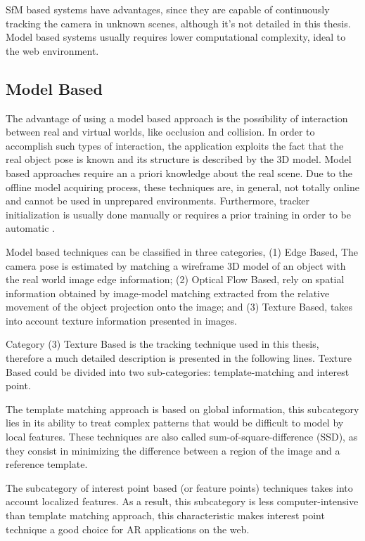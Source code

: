 SfM based systems have advantages, since they are capable of continuously tracking the camera in unknown scenes, although it's not detailed in this thesis. Model based systems usually requires lower computational complexity, ideal to the web environment.


\subsection{Model Based} %
\label{sub:basic_concepts:markerless_tracking_technique:model_based}

The advantage of using a model based approach is the possibility of interaction between real and virtual worlds, like occlusion and collision. In order to accomplish such types of interaction, the application exploits the fact that the real object pose is known and its structure is described by the 3D model. Model based approaches require an a priori knowledge about the real scene. Due to the offline model acquiring process, these techniques are, in general, not totally online and cannot be used in unprepared environments. Furthermore, tracker initialization is usually done manually or requires a prior training in order to be automatic \cite{Teichrieb2007}.

Model based techniques can be classified in three categories, (1) Edge Based, The camera pose is estimated by matching a wireframe 3D model of an object with the real world image edge information; (2) Optical Flow Based, rely on spatial information obtained by image-model matching extracted from the relative movement of the object projection onto the image; and (3) Texture Based, takes into account texture information presented in images.

Category (3) Texture Based is the tracking technique used in this thesis, therefore a much detailed description is presented in the following lines. Texture Based could be divided into two sub-categories: template-matching and interest point.

The template matching approach is based on global information, this subcategory lies in its ability to treat complex patterns that would be difficult to model by local features. These techniques are also called sum-of-square-difference (SSD), as they consist in minimizing the difference between a region of the image and a reference template.

The subcategory of interest point based (or feature points) techniques takes into account localized features. As a result, this subcategory is less computer-intensive than template matching approach, this characteristic makes interest point technique a good choice for AR applications on the web.

